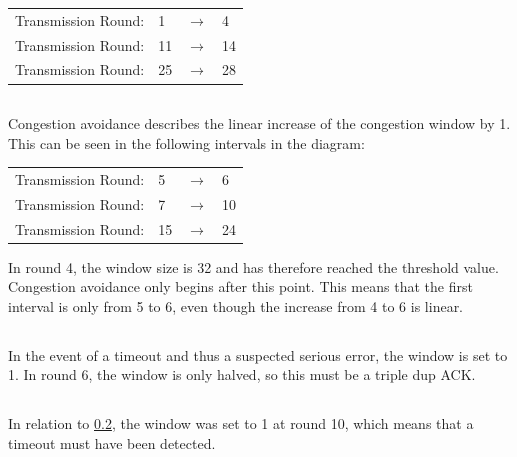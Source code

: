 \documentclass{article}
\begin{document}
        \begin{tabular}{l l l l}
            Transmission Round:  & 1 & $\xrightarrow{}$  & 4 \\
            Transmission Round:  & 11 & $\xrightarrow{}$ & 14 \\
            Transmission Round:  & 25 & $\xrightarrow{}$ & 28
        \end{tabular}
    
    \subsection{}

        Congestion avoidance describes the linear increase of the congestion window by 1. This can be seen in the following intervals in the diagram:

        \begin{tabular}{l l l l}
            Transmission Round:  & 5 & $\xrightarrow{}$  & 6 \\
            Transmission Round:  & 7 & $\xrightarrow{}$ & 10 \\
            Transmission Round:  & 15 & $\xrightarrow{}$ & 24
        \end{tabular}

        In round 4, the window size is 32 and has therefore reached the threshold value. Congestion avoidance only begins after this point. This means that the first interval is only from 5 to 6, even though the increase from 4 to 6 is linear.

    \subsection{} \label{excercise d}

        In the event of a timeout and thus a suspected serious error, the window is set to 1. In round 6, the window is only halved, so this must be a triple dup ACK.

    \subsection{}

        In relation to \ref{excercise d}, the window was set to 1 at round 10, which means that a timeout must have been detected.
    
    \subsection{}
\end{document}
